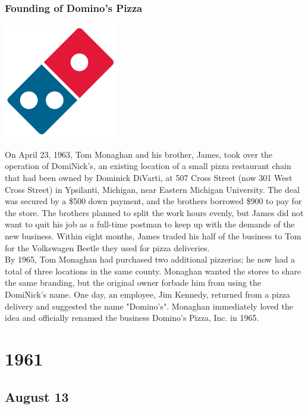 \documentclass[11pt]{report}
\begin{document}
\subsection{Founding of Domino's Pizza}
\vspace{2mm}\begin{center}\includegraphics[width=5cm]{./img/dominosPizzaLogo.jpg}\end{center}
On April 23, 1963, Tom Monaghan and his brother, James, took over the operation of DomiNick's, an existing location of a small pizza restaurant chain that had been owned by Dominick DiVarti, at 507 Cross Street (now 301 West Cross Street) in Ypsilanti, Michigan, near Eastern Michigan University. The deal was secured by a \$500 down payment, and the brothers borrowed \$900 to pay for the store. The brothers planned to split the work hours evenly, but James did not want to quit his job as a full-time postman to keep up with the demands of the new business. Within eight months, James traded his half of the business to Tom for the Volkswagen Beetle they used for pizza deliveries.\\ \indent By 1965, Tom Monaghan had purchased two additional pizzerias; he now had a total of three locations in the same county. Monaghan wanted the stores to share the same branding, but the original owner forbade him from using the DomiNick's name. One day, an employee, Jim Kennedy, returned from a pizza delivery and suggested the name "Domino's". Monaghan immediately loved the idea and officially renamed the business Domino's Pizza, Inc. in 1965.

\chapter{1961}
\section{August 13}
\end{document}

